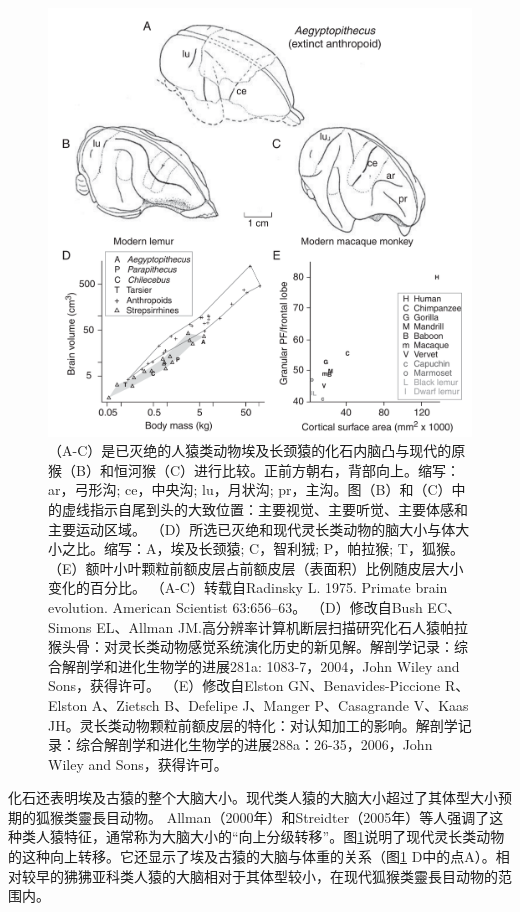 \begin{figure}[!htb]
	\centering
	\includegraphics[width=0.8\linewidth]{image_pfc/Fig_2_7}
	\caption{（A-C）是已灭绝的人猿类动物埃及长颈猿的化石内脑凸与现代的原猴（B）和恒河猴（C）进行比较。正前方朝右，背部向上。缩写：ar，弓形沟; ce，中央沟; lu，月状沟; pr，主沟。图（B）和（C）中的虚线指示自尾到头的大致位置：主要视觉、主要听觉、主要体感和主要运动区域。 （D）所选已灭绝和现代灵长类动物的脑大小与体大小之比。缩写：A，埃及长颈猿; C，智利狨; P，帕拉猴; T，狐猴。 （E）额叶小叶颗粒前额皮层占前额皮层（表面积）比例随皮层大小变化的百分比。 （A-C）转载自Radinsky L. 1975. Primate brain evolution. American Scientist 63:656–63。 （D）修改自Bush EC、Simons EL、Allman JM.高分辨率计算机断层扫描研究化石人猿帕拉猴头骨：对灵长类动物感觉系统演化历史的新见解。解剖学记录：综合解剖学和进化生物学的进展281a: 1083-7，2004，John Wiley and Sons，获得许可。 （E）修改自Elston GN、Benavides-Piccione R、Elston A、Zietsch B、Defelipe J、Manger P、Casagrande V、Kaas JH。灵长类动物颗粒前额皮层的特化：对认知加工的影响。解剖学记录：综合解剖学和进化生物学的进展288a：26-35，2006，John Wiley and Sons，获得许可。\label{fig:fig_2_7}}
\end{figure}


化石还表明埃及古猿的整个大脑大小。现代类人猿的大脑大小超过了其体型大小预期的狐猴类靈長目动物。 Allman（2000年）和Streidter（2005年）等人强调了这种类人猿特征，通常称为大脑大小的“向上分级转移”。图\ref{fig:fig_2_7}说明了现代灵长类动物的这种向上转移。它还显示了埃及古猿的大脑与体重的关系（图\ref{fig:fig_2_7} D中的点A）。相对较早的狒狒亚科类人猿的大脑相对于其体型较小，在现代狐猴类靈長目动物的范围内。

